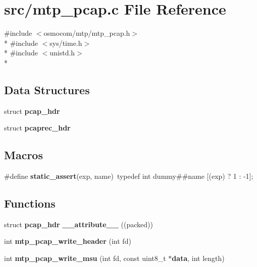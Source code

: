 \section{src/mtp\+\_\+pcap.c File Reference}
\label{mtp__pcap_8c}
{\ttfamily \#include $<$osmocom/mtp/mtp\+\_\+pcap.\+h$>$}\\*
{\ttfamily \#include $<$sys/time.\+h$>$}\\*
{\ttfamily \#include $<$unistd.\+h$>$}\\*
\subsection*{Data Structures}
\begin{DoxyCompactItemize}
\item 
struct {\bf pcap\+\_\+hdr}
\item 
struct {\bf pcaprec\+\_\+hdr}
\end{DoxyCompactItemize}
\subsection*{Macros}
\begin{DoxyCompactItemize}
\item 
\#define {\bf static\+\_\+assert}(exp,  name)~typedef int dummy\#\#name [(exp) ? 1 \+: -\/1];
\end{DoxyCompactItemize}
\subsection*{Functions}
\begin{DoxyCompactItemize}
\item 
struct {\bf pcap\+\_\+hdr} {\bf \+\_\+\+\_\+attribute\+\_\+\+\_\+} ((packed))
\item 
int {\bf mtp\+\_\+pcap\+\_\+write\+\_\+header} (int fd)
\item 
int {\bf mtp\+\_\+pcap\+\_\+write\+\_\+msu} (int fd, const uint8\+\_\+t $\ast${\bf data}, int length)
\end{DoxyCompactItemize}
